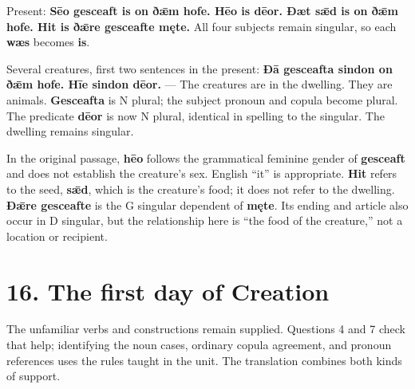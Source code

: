 Present: \textbf{Sēo gesceaft is on ðǣm hofe. Hēo is dēor. Ðæt sǣd is on ðǣm hofe. Hit is ðǣre gesceafte męte.} All four subjects remain singular, so each \textbf{wæs} becomes \textbf{is}.

Several creatures, first two sentences in the present: \textbf{Ðā gesceafta sindon on ðǣm hofe. Hīe sindon dēor.} — The creatures are in the dwelling. They are animals. \textbf{Gesceafta} is N plural; the subject pronoun and copula become plural. The predicate \textbf{dēor} is now N plural, identical in spelling to the singular. The dwelling remains singular.

In the original passage, \textbf{hēo} follows the grammatical feminine gender of \textbf{gesceaft} and does not establish the creature's sex. English “it” is appropriate. \textbf{Hit} refers to the seed, \textbf{sǣd}, which is the creature's food; it does not refer to the dwelling. \textbf{Ðǣre gesceafte} is the G singular dependent of \textbf{męte}. Its ending and article also occur in D singular, but the relationship here is “the food of the creature,” not a location or recipient.

\section*{16. The first day of Creation}

The unfamiliar verbs and constructions remain supplied. Questions 4 and 7 check that help; identifying the noun cases, ordinary copula agreement, and pronoun references uses the rules taught in the unit. The translation combines both kinds of support.


